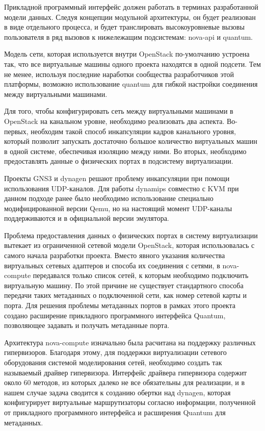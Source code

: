 Прикладной программный интерфейс должен работать в терминах разработанной модели данных.
Следуя концепции модульной архитектуры, он будет реализован в виде отдельного процесса,
и будет транслировать высокоуровневые вызовы пользователя в ряд вызовов к нижележащим
подсистемам: nova-api и quantum.

Модель сети, которая используется внутри OpenStack по-умолчанию устроена так, что 
все виртуальные машины одного проекта находятся в одной подсети. Тем не менее,
используя последние наработки сообщества разработчиков этой платформы, возможно использование
quantum для гибкой настройки соединения между виртуальными машинами.

Для того, чтобы конфигурировать сеть между виртуальными машинами в OpenStack на 
канальном уровне, необходимо реализовать два аспекта. Во-первых, необходим такой способ 
инкапсуляции кадров канального уровня, который позволит запускать достаточно большое
количество виртуальных машин в одной системе, обеспечивая изоляцию между ними.
Во вторых, необходимо предоставлять данные о физических портах в подсистему виртуализации.

Проекты GNS3 и dynagen решают проблему инкапсуляции при помощи использования UDP-каналов.
Для работы dynamips совместно с KVM при данном подходе ранее было необходимо использование 
специально модифицированной версии Qemu, но на настоящий момент UDP-каналы
поддерживаются и в официальной версии эмулятора.

Проблема предоставления данных о физических портах в систему виртуализации вытекает
из ограниченной сетевой модели OpenStack, которая использовалась с самого начала разработки
проекта. Вместо явного указания количества виртуальных сетевых адаптеров и способа их 
соединения с сетями, в nova-compute передавался только список сетей, к которым необходимо
подключить виртуальную машину. По этой причине не существует стандартного способа передачи
таких метаданных о подключенной сети, как номер сетевой карты и порта.
Для решения проблемы метаданных портов в рамках этого проекта создано расширение прикладного 
программного интерфейса Quantum, позволяющее задавать и получать метаданные порта.

Архитектура nova-compute изначально была расчитана на поддержку различных гипервизоров.
Благодаря этому, для поддержки виртуализации сетевого оборудования системой моделирования
сетей, необходимо создать так называемый драйвер гипервизора. Интерфейс драйвера гипервизора
содержит около 60 методов, из которых далеко не все обязательны для реализации, и
в нашем случае задача сводится к созданию обертки над dynagen, которая конфигурирует
виртуальные маршрутизаторы согласно информации, полученной от прикладного программного
интерфейса и расширения Quantum для метаданных.

